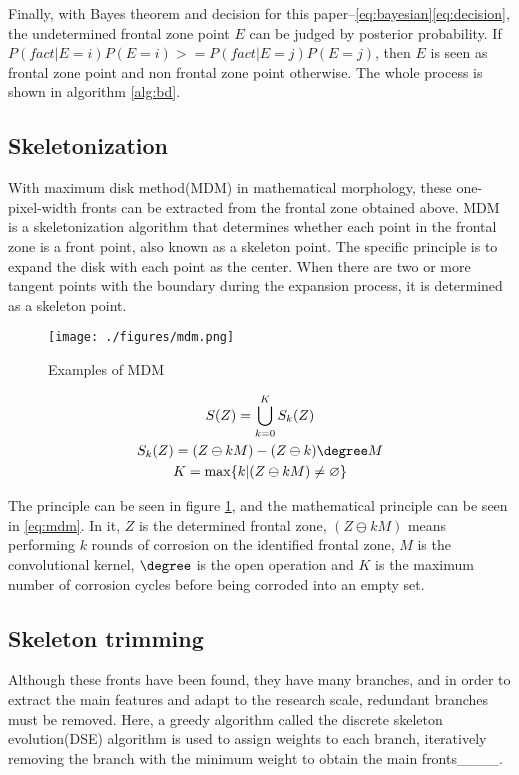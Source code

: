 Finally, with Bayes theorem and decision for this paper--\eqref{eq:bayesian}\eqref{eq:decision}, the undetermined frontal zone point $E$ can be judged by posterior probability. If $P(fact|E=i)P(E=i)>=P(fact|E=j)P(E=j)$, then $E$ is seen as frontal zone point and non frontal zone point otherwise. The whole process is shown in algorithm \ref{alg:bd}.

\subsection{Skeletonization}
With maximum disk method(MDM) in mathematical morphology, these one-pixel-width fronts can be extracted from the frontal zone obtained above. MDM is a skeletonization algorithm that determines whether each point in the frontal zone is a front point, also known as a skeleton point. The specific principle is to expand the disk with each point as the center. When there are two or more tangent points with the boundary during the expansion process, it is determined as a skeleton point. 

\begin{figure}
	\centering
	\texttt{[image: ./figures/mdm.png]}
	\caption{Examples of MDM} 
	\label{fig:mdm} 
\end{figure}

\begin{equation}\label{eq:mdm}
	\begin{gathered}
		S(Z)=\bigcup_{k=0}^K S_k (Z)\\
		S_k (Z)=(Z \ominus kM)-(Z \ominus k)\degree M\\
		K= \max \{k|(Z \ominus kM) \neq \varnothing \}
	\end{gathered}
\end{equation}

The principle can be seen in figure \ref{fig:mdm}, and the mathematical principle can be seen in \eqref{eq:mdm}. In it, $Z$ is the determined frontal zone, $(Z \ominus kM)$ means performing $k$ rounds of corrosion on the identified frontal zone, $M$ is the convolutional kernel, $\degree$ is the open operation and $K$ is the maximum number of corrosion cycles before being corroded into an empty set.

\subsection{Skeleton trimming}
Although these fronts have been found, they have many branches, and in order to extract the main features and adapt to the research scale, redundant branches must be removed. Here, a greedy algorithm called the discrete skeleton evolution(DSE) algorithm is used to assign weights to each branch, iteratively removing the branch with the minimum weight to obtain the main fronts____.

